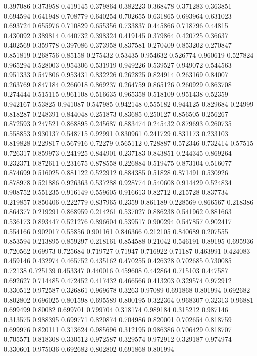 0.397086 0.373958
0.419145 0.379864
0.382223 0.368478
0.371283 0.363851
0.694594 0.641948
0.708779 0.640254
0.702655 0.631865
0.693964 0.631023
0.693724 0.655976
0.710829 0.655356
0.733837 0.445866
0.718796 0.44815
0.430092 0.389814
0.440732 0.398324
0.419145 0.379864
0.420725 0.36637
0.402569 0.359778
0.397086 0.373958
0.837581 0.270409
0.853202 0.270847
0.851819 0.268756
0.85158 0.275432
0.53435 0.954632
0.526774 0.960619
0.527824 0.965294
0.528003 0.954306
0.531919 0.949226
0.539527 0.949072
0.544563 0.951333
0.547806 0.953431
0.832226 0.262825
0.824914 0.263169
0.84007 0.263769
0.847184 0.266018
0.869237 0.264759
0.865126 0.260929
0.863708 0.274444
0.515115 0.961108
0.516635 0.965358
0.518109 0.951438
0.52359 0.942167
0.53825 0.941087
0.547985 0.942148
0.555182 0.944125
0.829684 0.24999
0.818287 0.248391
0.844048 0.251873
0.83685 0.250127
0.856505 0.256267
0.872593 0.247521
0.868895 0.245687
0.883474 0.245432
0.879693 0.260735
0.558853 0.930137
0.548715 0.92991
0.830961 0.241729
0.831173 0.233103
0.819828 0.229817
0.567916 0.72279
0.565112 0.728887
0.572346 0.732414
0.57515 0.726317
0.859973 0.241925
0.844901 0.237183
0.843851 0.244345
0.869264 0.232371
0.872611 0.231675
0.878558 0.226884
0.519475 0.873104
0.516077 0.874699
0.516025 0.881122
0.522912 0.884385
0.51828 0.871491
0.530926 0.878978
0.521886 0.926363
0.537288 0.928774
0.540608 0.914429
0.524834 0.908752
0.551235 0.916149
0.559605 0.916613
0.82712 0.215728
0.837734 0.219857
0.850406 0.222779
0.837965 0.2359
0.861189 0.228569
0.866567 0.218386
0.864377 0.219291
0.868959 0.214261
0.537027 0.886238
0.541962 0.881663
0.536173 0.893447
0.521276 0.896604
0.539517 0.900294
0.547857 0.902417
0.554166 0.902017
0.55856 0.901161
0.846366 0.212105
0.840689 0.207555
0.853594 0.213895
0.859297 0.218161
0.854588 0.21042
0.546191 0.89195
0.695936 0.720562
0.69973 0.725684
0.719727 0.71947
0.716922 0.71187
0.463991 0.424083
0.459146 0.432974
0.465752 0.435162
0.470255 0.426328
0.702685 0.730085
0.72138 0.725139
0.453347 0.440016
0.459608 0.442864
0.715103 0.447587
0.692627 0.714485
0.472452 0.417432
0.466566 0.413203
0.329574 0.972912
0.330512 0.972587
0.326861 0.969678
0.3263 0.97089
0.691868 0.801994
0.692682 0.802802
0.696025 0.801598
0.695589 0.800195
0.322364 0.968307
0.32313 0.96881
0.699499 0.80082
0.699701 0.799704
0.318174 0.989184
0.315212 0.987146
0.313575 0.988395
0.699771 0.820874
0.704986 0.820001
0.702654 0.818759
0.699976 0.820111
0.313624 0.985696
0.312195 0.986386
0.706429 0.818707
0.705571 0.818308
0.330512 0.972587
0.329574 0.972912
0.329187 0.974974
0.330601 0.975036
0.692682 0.802802
0.691868 0.801994
